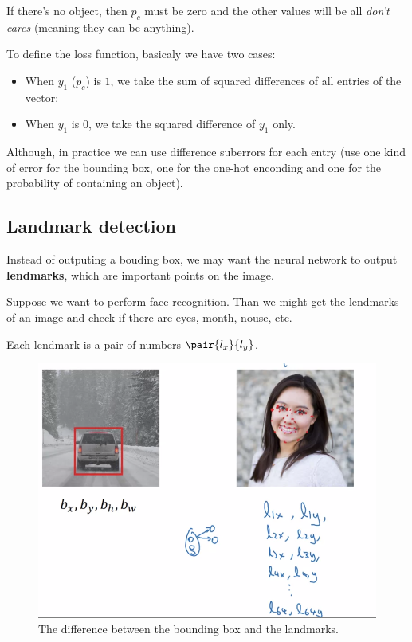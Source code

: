 \documentclass[12pt, a4paper, oneside]{book}
\begin{document}
If there's no object, then $p_c$ must be zero and the other values will be all
\textit{don't cares} (meaning they can be anything).

To define the loss function, basicaly we have two cases:
\begin{itemize}
    \item When $y_1$ ($p_c$) is $1$, we take the sum of squared differences of
        all entries of the vector;
    \item When $y_1$ is $0$, we take the squared difference of $y_1$ only.
\end{itemize}

Although, in practice we can use difference suberrors for each entry (use one
kind of error for the bounding box, one for the one-hot enconding and one for
the probability of containing an object).

\subsection{Landmark detection}%
\label{sub:landmark_detection}

Instead of outputing a bouding box, we may want the neural network to output
\textbf{lendmarks}, which are important points on the image.

Suppose we want to perform face recognition. Than we might get the lendmarks of
an image and check if there are eyes, month, nouse, etc.

Each lendmark is a pair of numbers $\pair{l_x}{l_y}$.

\begin{figure}[h]
\centering
\includegraphics[scale=0.5]{Res/Lendmark_detection.png}
\caption{The difference between the bounding box and the landmarks.}
\label{Lendmark_detection.png}
\end{figure}
\end{document}
